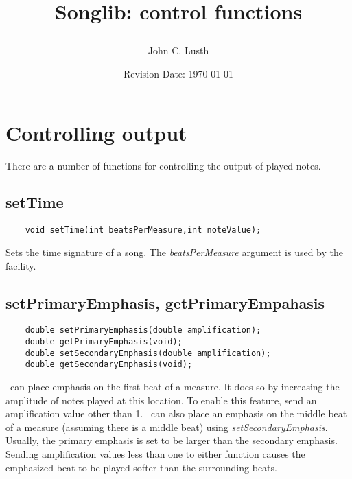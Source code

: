 \documentclass{article}
\title{Songlib: control functions\\
\date{Revision Date: \today}}
\author{John C. Lusth}
\begin{document}
\maketitle

\W\subsubsection*{}
\W\htmlrule

\section*{Controlling output}

There are a number of functions for controlling the output of played notes.

\subsection*{setTime}

\begin{verbatim}
    void setTime(int beatsPerMeasure,int noteValue);
\end{verbatim}

Sets the time signature of a song. The {\it beatsPerMeasure} argument is used by
the  facility.

\subsection*{setPrimaryEmphasis, getPrimaryEmpahasis}

\begin{verbatim}
    double setPrimaryEmphasis(double amplification);
    double getPrimaryEmphasis(void);
    double setSecondaryEmphasis(double amplification);
    double getSecondaryEmphasis(void);
\end{verbatim}

\Songlib\ can place emphasis on the first beat of a measure. It does so
by increasing the amplitude of notes played at this location. To
enable this feature, send an amplification value other than 1.
\Songlib\ can also place an emphasis on the middle beat of
a measure (assuming there is a middle beat) using
{\it setSecondaryEmphasis}.
Usually, the primary emphasis is set to be larger than the secondary
emphasis.
Sending amplification values less than one to either function causes
the emphasized beat to be played softer than the surrounding beats.
\end{document}
